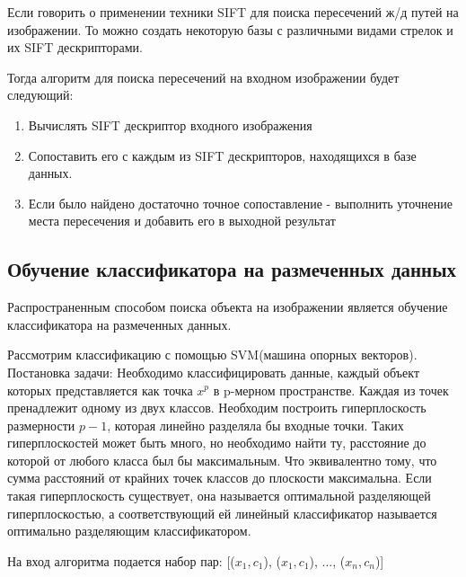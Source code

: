 Если говорить о применении техники SIFT для поиска пересечений ж/д путей на изображении. То можно создать некоторую базы с различными видами стрелок и их SIFT дескрипторами. 

Тогда алгоритм для поиска пересечений на входном изображении будет следующий:
\begin{enumerate}
	\item Вычислять SIFT дескриптор входного изображения
	\item Сопоставить его с каждым из SIFT дескрипторов, находящихся в базе данных.
	\item Если было найдено достаточно точное сопоставление - выполнить уточнение места пересечения и добавить его в выходной результат
\end{enumerate}

\subsection{Обучение классификатора на размеченных данных}
\label{SVM}
Распространенным способом поиска объекта на изображении является обучение классификатора на размеченных данных.

Рассмотрим классификацию с помощью SVM(машина опорных векторов)\cite{b:SVM}.
Постановка задачи: \newline
Необходимо классифицировать данные, каждый объект которых представляется как точка $x^p$ в p-мерном пространстве. Каждая из точек пренадлежит одному из двух классов. Необходим построить гиперплоскость размерности $p-1$, которая линейно разделяла бы входные точки. 
Таких гиперплоскостей может быть много, но необходимо найти ту, расстояние до которой от любого класса был бы максимальным. Что эквивалентно тому, что сумма расстояний от крайних точек классов до плоскости максимальна. 
Если такая гиперплоскость существует, она называется оптимальной разделяющей гиперплоскостью, а соответствующий ей линейный классификатор называется оптимально разделяющим классификатором.

На вход алгоритма подается набор пар: [($x_1, c_1$), ($x_1, c_1$), ..., ($x_n, c_n$)]

